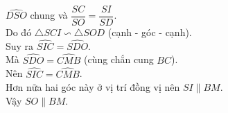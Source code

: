 \begin{bt}[2,5 điểm]
{\begin{enumerate}
			$\widehat{D S O}$ chung và $\dfrac{S C}{S O}=\dfrac{S I}{S D}$.\\
			Do đó $\triangle S C I \backsim \triangle S O D$ (cạnh - góc - cạnh).\\
			Suy ra $\widehat{S I C}=\widehat{S D O}$.\\
			Mà $\widehat{S D O}=\widehat{C M B}$ (cùng chắn cung $B C$).\\
			Nên $\widehat{S I C}=\widehat{C M B}$.\\
			Hơn nữa hai góc này ở vị trí đồng vị nên $S I \parallel B M$.\\
			Vậy $S O \parallel B M$.
		\end{enumerate}
	}
\end{bt}
